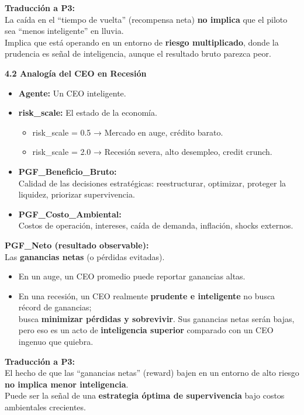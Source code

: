 \textbf{Traducción a P3:}\\
La caída en el ``tiempo de vuelta'' (recompensa neta) \textbf{no
implica} que el piloto sea ``menos inteligente'' en lluvia.\\
Implica que está operando en un entorno de \textbf{riesgo multiplicado},
donde la prudencia es señal de inteligencia, aunque el resultado bruto
parezca peor.

\textbf{4.2 Analogía del CEO en Recesión}

\begin{itemize}
\item
  \textbf{Agente:} Un CEO inteligente.
\item
  \textbf{risk\_scale:} El estado de la economía.

  \begin{itemize}
  \item
    risk\_scale = 0.5 → Mercado en auge, crédito barato.
  \item
    risk\_scale = 2.0 → Recesión severa, alto desempleo, credit crunch.
  \end{itemize}
\item
  \textbf{PGF\_Beneficio\_Bruto:}\\
  Calidad de las decisiones estratégicas: reestructurar, optimizar,
  proteger la liquidez, priorizar supervivencia.
\item
  \textbf{PGF\_Costo\_Ambiental:}\\
  Costos de operación, intereses, caída de demanda, inflación, shocks
  externos.
\end{itemize}

\textbf{PGF\_Neto (resultado observable):}\\
Las \textbf{ganancias netas} (o pérdidas evitadas).

\begin{itemize}
\item
  En un auge, un CEO promedio puede reportar ganancias altas.
\item
  En una recesión, un CEO realmente \textbf{prudente e inteligente} no
  busca récord de ganancias;\\
  busca \textbf{minimizar pérdidas y sobrevivir}. Sus ganancias netas
  serán bajas, pero eso es un acto de \textbf{inteligencia superior}
  comparado con un CEO ingenuo que quiebra.
\end{itemize}

\textbf{Traducción a P3:}\\
El hecho de que las ``ganancias netas'' (reward) bajen en un entorno de
alto riesgo \textbf{no implica menor inteligencia}.\\
Puede ser la señal de una \textbf{estrategia óptima de supervivencia}
bajo costos ambientales crecientes.

